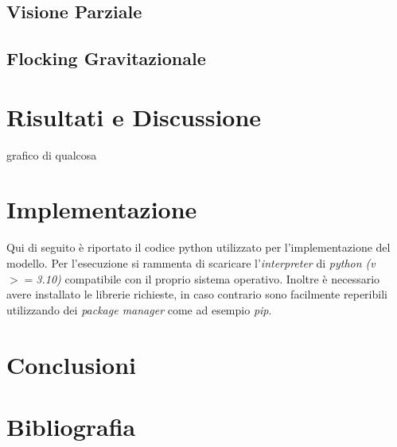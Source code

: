 \documentclass{article}
\begin{document}
\subsection{Visione Parziale}
\label{Sec:3.3}
\subsection{Flocking Gravitazionale}
\label{Sec:3.4}
\section{Risultati e Discussione}
\label{Sec:4}
grafico di qualcosa

\section{Implementazione}
\label{Sec:5}
Qui di seguito è riportato il codice python utilizzato per l'implementazione del modello. Per l'esecuzione si rammenta di scaricare l'\textit{interpreter} di \textit{python (v ${>=}$3.10)} compatibile con il proprio sistema operativo. Inoltre è necessario avere installato le librerie richieste, in caso contrario sono facilmente reperibili utilizzando dei \textit{package manager} come ad esempio \textit{pip}.

\section{Conclusioni}
\label{Sec:6}

\section{Bibliografia}
\label{Sec:7}
\end{document}
